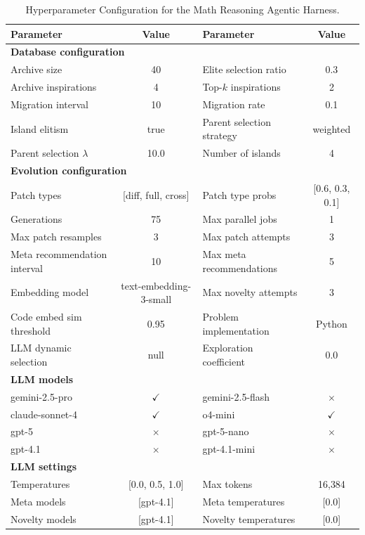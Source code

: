 \begin{table}[h]
\centering
\small
\begin{tabular}{lclc}
\toprule
\textbf{Parameter} & \textbf{Value} & \textbf{Parameter} & \textbf{Value} \\
\midrule
\multicolumn{4}{l}{\textbf{Database configuration}} \\
\midrule
Archive size & 40 & Elite selection ratio & 0.3 \\
Archive inspirations & 4 & Top-$k$ inspirations & 2 \\
Migration interval & 10 & Migration rate & 0.1 \\
Island elitism & true & Parent selection strategy & weighted \\
Parent selection $\lambda$ & 10.0 & Number of islands & 4 \\
\midrule
\multicolumn{4}{l}{\textbf{Evolution configuration}} \\
\midrule
Patch types & [diff, full, cross] & Patch type probs & [0.6, 0.3, 0.1] \\
Generations & 75 & Max parallel jobs & 1 \\
Max patch resamples & 3 & Max patch attempts & 3 \\
Meta recommendation interval & 10 & Max meta recommendations & 5 \\
Embedding model & text-embedding-3-small & Max novelty attempts & 3 \\
Code embed sim threshold & 0.95 & Problem implementation & Python \\
LLM dynamic selection & null & Exploration coefficient & 0.0 \\
\midrule
\multicolumn{4}{l}{\textbf{LLM models}} \\
\midrule
gemini-2.5-pro & $\checkmark$ & gemini-2.5-flash & $\times$ \\
claude-sonnet-4 & $\checkmark$ & o4-mini & $\checkmark$ \\
gpt-5 & $\times$ & gpt-5-nano & $\times$ \\
gpt-4.1 & $\times$ & gpt-4.1-mini & $\times$ \\
\midrule
\multicolumn{4}{l}{\textbf{LLM settings}} \\
\midrule
Temperatures & [0.0, 0.5, 1.0] & Max tokens & 16{,}384 \\
Meta models & [gpt-4.1] & Meta temperatures & [0.0] \\
Novelty models & [gpt-4.1] & Novelty temperatures & [0.0] \\
\bottomrule
\end{tabular}
  \caption{\ouralgo Hyperparameter Configuration for the Math Reasoning Agentic Harness.}
  \label{tab:hyperparams_aime}
\end{table}

